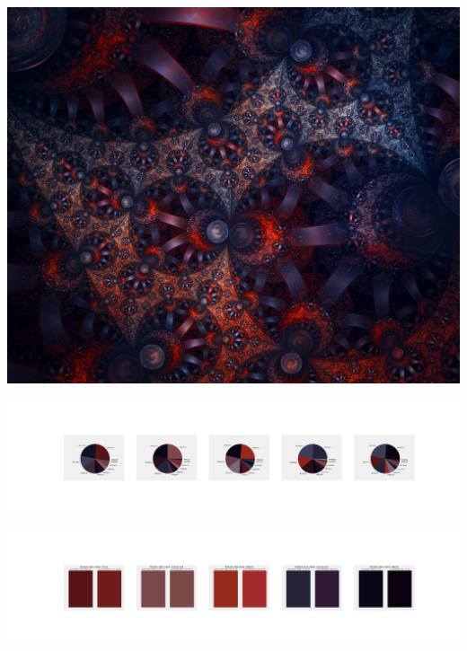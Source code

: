 \documentclass[11pt]{article}
\begin{document}
\begin{landscape}
    \begin{center}
    \includegraphics[width=\textwidth]{./nbimg/file (158).jpg}
    \end{center}

    \begin{center}
    \includegraphics[width=250mm]{./nbimg/pie-65.jpg}
    \end{center}

    \begin{center}
    \includegraphics[width=250mm]{./nbimg/peak-65.jpg}
    \end{center}
    


\end{landscape}
\end{document}
